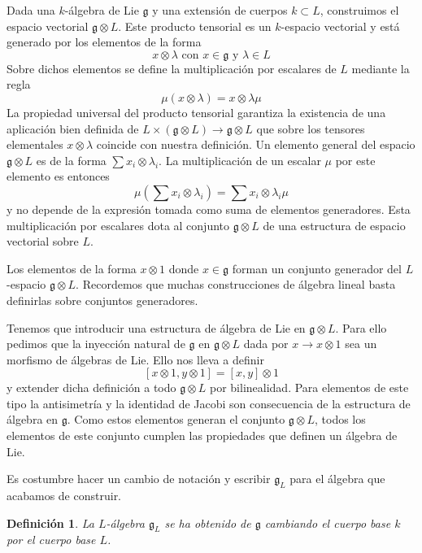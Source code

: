 \documentclass[a4paper,draft,12pt]{article}
\newtheorem{defi}{Definición}[section]%
\begin{document}
Dada una $k$-álgebra de Lie $\mathfrak{g}$ y una extensión de cuerpos $k \subset L$, construimos el espacio vectorial $\mathfrak{g}\otimes L$.  Este producto tensorial es un $k$-espacio vectorial y está generado por los elementos de la forma
$$
x \otimes \lambda \text{ con } x \in \mathfrak{g} \text{ y } \lambda \in L
$$
Sobre dichos elementos se define la multiplicación por escalares de $L$ mediante la regla
$$
\mu(x \otimes \lambda) = x \otimes \lambda \mu
$$
La propiedad universal del producto tensorial garantiza la existencia de una aplicación bien definida de $L \times (\mathfrak{g}\otimes L) \rightarrow \mathfrak{g}\otimes L$
que sobre los tensores elementales $x \otimes \lambda$ coincide con nuestra definición.  Un elemento general del espacio $\mathfrak{g} \otimes L$ es de la forma $\sum x_i \otimes \lambda_i$.  La multiplicación de un escalar $\mu$ por este elemento es entonces
$$
\mu(\sum x_i \otimes \lambda_i) = \sum x_i \otimes \lambda_i \mu
$$
y no depende de la expresión tomada como suma de elementos generadores.  Esta multiplicación por escalares dota al conjunto $\mathfrak{g}\otimes L$ de una estructura de espacio vectorial sobre $L$.

\bigskip


Los elementos de la forma $x\otimes 1$ donde $x \in \mathfrak{g}$ forman un conjunto generador del $L$-espacio $\mathfrak{g}\otimes L$.  Recordemos que muchas construcciones de álgebra lineal basta definirlas sobre conjuntos generadores.

\bigskip

Tenemos que introducir una estructura de álgebra de Lie en $\mathfrak{g}\otimes L$. Para ello pedimos que la inyección natural de $\mathfrak{g}$ en  $\mathfrak{g} \otimes L$ dada por $x\rightarrow x\otimes 1$ sea un morfismo de álgebras de Lie.  Ello nos lleva a definir
$$
[x \otimes 1, y\otimes 1]= [x,y]\otimes 1
$$
y extender dicha definición a todo $\mathfrak{g} \otimes L$ por bilinealidad.  Para elementos de este tipo la antisimetría y la identidad de Jacobi son consecuencia de la estructura de álgebra en $\mathfrak{g}$.  Como estos elementos generan el conjunto $\mathfrak{g}\otimes L$, todos los elementos de este conjunto cumplen las propiedades que definen un álgebra de Lie.

Es costumbre hacer un cambio de notación  y escribir $\mathfrak{g}_L$ para el álgebra que acabamos de construir.

\begin{defi}

La $L$-álgebra $\mathfrak{g}_L$ se ha obtenido de $\mathfrak{g}$ cambiando el cuerpo base $k$ por el cuerpo base $L$.

\end{defi}
\end{document}
